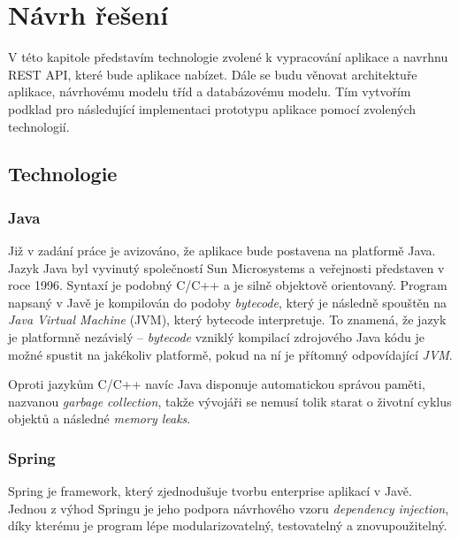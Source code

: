 \documentclass[thesis=B,czech]{FITthesis}[2012/06/26]
\begin{document}
	

\chapter{Návrh řešení}
	\label{chapter:design}
	
	V této kapitole představím technologie zvolené k vypracování aplikace a navrhnu REST API, které bude aplikace nabízet. Dále se budu věnovat architektuře aplikace, návrhovému modelu tříd a databázovému modelu. Tím vytvořím podklad pro následující implementaci prototypu aplikace pomocí zvolených technologií.

	\section{Technologie}
	
		\subsection{Java}
			Již v zadání práce je avizováno, že aplikace bude postavena na platformě Java. \cite{java} Jazyk Java byl vyvinutý společností Sun Microsystems a veřejnosti představen v roce 1996. Syntaxí je podobný C/C++ a je silně objektově orientovaný. Program napsaný v Javě je kompilován do podoby \textit{bytecode}, který je následně spouštěn na \textit{Java Virtual Machine} (JVM), který bytecode interpretuje. To znamená, že jazyk je platformně nezávislý -- \textit{bytecode} vzniklý kompilací zdrojového Java kódu je možné spustit na jakékoliv platformě, pokud na ní je přítomný odpovídající \textit{JVM}. 
			
			Oproti jazykům C/C++ navíc Java disponuje automatickou správou paměti, nazvanou \textit{garbage collection}, takže vývojáři se nemusí tolik starat o životní cyklus objektů a následné \textit{memory leaks}. \cite{what-is-java} \cite{pjv-java}
		
		\subsection{Spring}
			Spring je framework, který zjednodušuje tvorbu enterprise aplikací v Javě. \cite{spring} Jednou z výhod Springu je jeho podpora návrhového vzoru \textit{dependency injection}, díky kterému je program lépe modularizovatelný, testovatelný a znovupoužitelný.\cite{dependency-injection}
			
\end{document}
